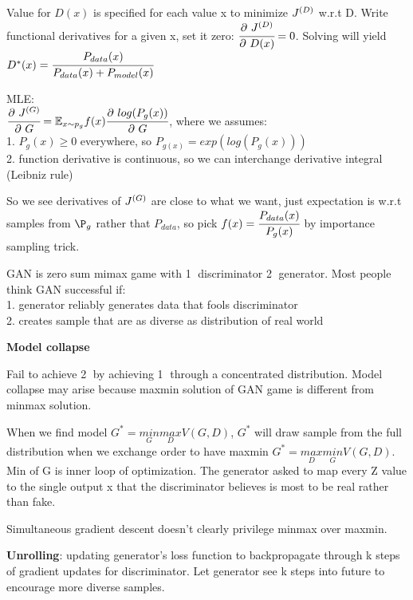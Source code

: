 \documentclass[12pt,a4paper]{article}
\begin{document}
Value for $D(x)$ is specified for each value x to minimize $J^{(D)}$ w.r.t D.
Write functional derivatives for a given x, set it zero: 
$\cfrac{\partial\ J^{(D)}}{\partial\ D(x)}=0$. Solving will yield $D^*(x)=\cfrac{P_{data}(x)}{P_{data}(x)+P_{model}(x)}$


\vspace{0.5cm}
MLE:\\
$\cfrac{\partial\ J^{(G)}}{\partial\ G}=\mathbb{E}_{x\sim p_g}f(x)\cfrac{\partial\ log(P_g(x))}{\partial\ G}$, where we assumes:\\
1. $P_g(x)\geq 0$ everywhere, so $P_{g(x)}=exp(log(P_g(x)))$\\
2. function derivative is continuous, so we can interchange derivative integral (Leibniz rule)

So we see derivatives of $J^{(G)}$ are close to what we want, just expectation is w.r.t samples from $\P_g$ rather that $P_{data}$, so pick $f(x)=\cfrac{P_{data}(x)}{P_g(x)}$ by importance sampling trick. 

GAN is zero sum mimax game with \textcircled{1} discriminator \textcircled{2} generator. Most people think GAN successful if:\\
1. generator reliably generates data that fools discriminator\\
2. creates sample that are as diverse as distribution of real world



\textbf{Model collapse}

Fail to achieve \textcircled{2} by achieving \textcircled{1} through a concentrated distribution. Model collapse may arise because maxmin solution of GAN game is different from minmax solution. 

When we find model $G^*=\underset{G}{min}\underset{D}{max} V(G,D)$, $G^*$ will draw sample from the full distribution when we exchange order to have maxmin $G^*=\underset{D}{max}\underset{G}{min} V(G,D)$.
Min of G is inner loop of optimization. The generator asked to map every Z value to the single output x that the discriminator believes is most to be real rather than fake. 

Simultaneous gradient descent doesn't clearly privilege minmax over maxmin. 

\textbf{Unrolling}: updating generator's loss function to backpropagate through k steps of gradient updates for discriminator. Let generator see k steps into future to encourage more diverse samples. 
\end{document}
